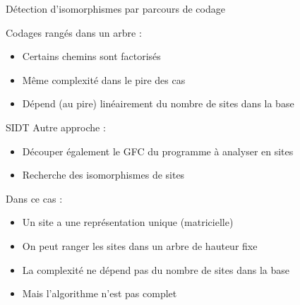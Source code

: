 \documentclass{beamer}
\begin{document}
\begin{frame}{Détection d'isomorphismes par parcours de codage}
\begin{minipage}{.40\textwidth}
{
}
\end{minipage}
\begin{minipage}{.55\textwidth}
Codages rangés dans un arbre :
 \begin{itemize}
  \item Certains chemins sont factorisés
  \item Même complexité dans le pire des cas
  \item Dépend (au pire) linéairement du nombre de sites dans la base
 \end{itemize}
\end{minipage}
\end{frame}


\begin{frame}{SIDT}
Autre approche :
 \begin{itemize}
  \item Découper également le GFC du programme à analyser en sites
  \item Recherche des isomorphismes de sites
 \end{itemize}
Dans ce cas :
\begin{itemize}
 \item Un site a une représentation unique (matricielle)
 \item On peut ranger les sites dans un arbre de hauteur fixe
 \item La complexité ne dépend pas du nombre de sites dans la base
 \item Mais l'algorithme n'est pas complet
\end{itemize}
\end{frame}
\end{document}
